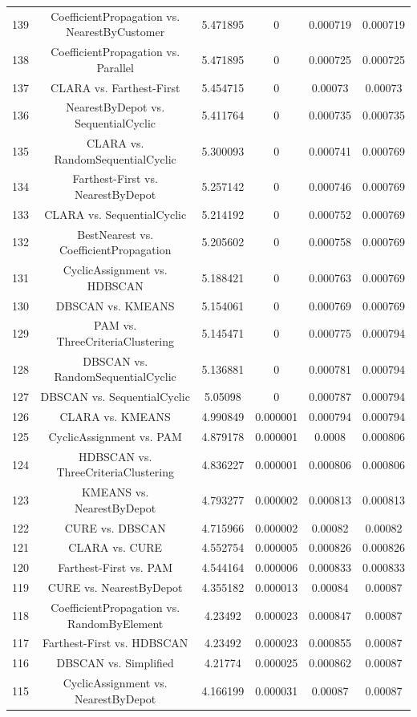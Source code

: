 \documentclass[a4paper,10pt]{article}
\begin{document}
\begin{landscape}
\begin{table}[!htp]
\begin{tabular}{cccccc}
139&CoefficientPropagation vs. NearestByCustomer&5.471895&0&0.000719&0.000719\\
138&CoefficientPropagation vs. Parallel&5.471895&0&0.000725&0.000725\\
137&CLARA vs. Farthest-First&5.454715&0&0.00073&0.00073\\
136&NearestByDepot vs. SequentialCyclic&5.411764&0&0.000735&0.000735\\
135&CLARA vs. RandomSequentialCyclic&5.300093&0&0.000741&0.000769\\
134&Farthest-First vs. NearestByDepot&5.257142&0&0.000746&0.000769\\
133&CLARA vs. SequentialCyclic&5.214192&0&0.000752&0.000769\\
132&BestNearest vs. CoefficientPropagation&5.205602&0&0.000758&0.000769\\
131&CyclicAssignment vs. HDBSCAN&5.188421&0&0.000763&0.000769\\
130&DBSCAN vs. KMEANS&5.154061&0&0.000769&0.000769\\
129&PAM vs. ThreeCriteriaClustering&5.145471&0&0.000775&0.000794\\
128&DBSCAN vs. RandomSequentialCyclic&5.136881&0&0.000781&0.000794\\
127&DBSCAN vs. SequentialCyclic&5.05098&0&0.000787&0.000794\\
126&CLARA vs. KMEANS&4.990849&0.000001&0.000794&0.000794\\
125&CyclicAssignment vs. PAM&4.879178&0.000001&0.0008&0.000806\\
124&HDBSCAN vs. ThreeCriteriaClustering&4.836227&0.000001&0.000806&0.000806\\
123&KMEANS vs. NearestByDepot&4.793277&0.000002&0.000813&0.000813\\
122&CURE vs. DBSCAN&4.715966&0.000002&0.00082&0.00082\\
121&CLARA vs. CURE&4.552754&0.000005&0.000826&0.000826\\
120&Farthest-First vs. PAM&4.544164&0.000006&0.000833&0.000833\\
119&CURE vs. NearestByDepot&4.355182&0.000013&0.00084&0.00087\\
118&CoefficientPropagation vs. RandomByElement&4.23492&0.000023&0.000847&0.00087\\
117&Farthest-First vs. HDBSCAN&4.23492&0.000023&0.000855&0.00087\\
116&DBSCAN vs. Simplified&4.21774&0.000025&0.000862&0.00087\\
115&CyclicAssignment vs. NearestByDepot&4.166199&0.000031&0.00087&0.00087\\

\end{tabular}
\end{table}
\end{landscape}
\end{document}
